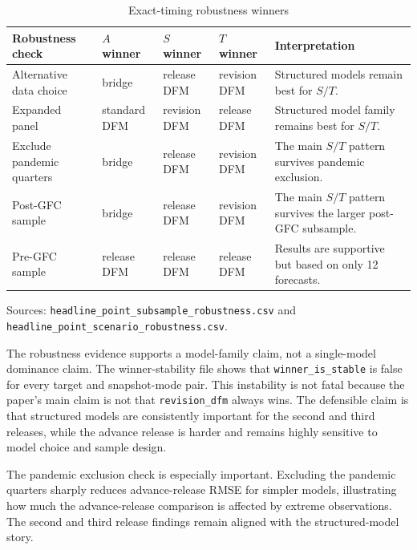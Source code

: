 \documentclass[12pt]{article}
\begin{document}
\begin{table}[!htbp]
\centering
\begin{threeparttable}
\caption{Exact-timing robustness winners}
\label{tab:robustness}
\small
\begin{tabular}{llllp{5.6cm}}
\toprule
Robustness check & $A$ winner & $S$ winner & $T$ winner & Interpretation \\
\midrule
Alternative data choice & bridge & release DFM & revision DFM & Structured models remain best for $S/T$. \\
Expanded panel & standard DFM & revision DFM & release DFM & Structured model family remains best for $S/T$. \\
Exclude pandemic quarters & bridge & release DFM & revision DFM & The main $S/T$ pattern survives pandemic exclusion. \\
Post-GFC sample & bridge & release DFM & revision DFM & The main $S/T$ pattern survives the larger post-GFC subsample. \\
Pre-GFC sample & release DFM & release DFM & release DFM & Results are supportive but based on only 12 forecasts. \\
\bottomrule
\end{tabular}
\begin{tablenotes}
\footnotesize
\item Sources: \texttt{headline\_point\_subsample\_robustness.csv} and \texttt{headline\_point\_scenario\_robustness.csv}.
\end{tablenotes}
\end{threeparttable}
\end{table}

The robustness evidence supports a model-family claim, not a single-model dominance claim. The winner-stability file shows that \texttt{winner\_is\_stable} is false for every target and snapshot-mode pair. This instability is not fatal because the paper's main claim is not that \texttt{revision\_dfm} always wins. The defensible claim is that structured models are consistently important for the second and third releases, while the advance release is harder and remains highly sensitive to model choice and sample design.

The pandemic exclusion check is especially important. Excluding the pandemic quarters sharply reduces advance-release RMSE for simpler models, illustrating how much the advance-release comparison is affected by extreme observations. The second and third release findings remain aligned with the structured-model story.
\end{document}
